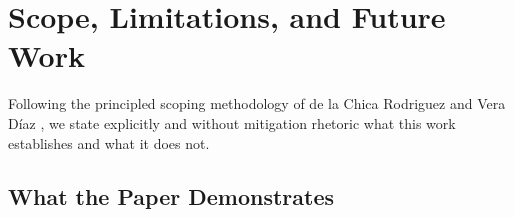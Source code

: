 \documentclass[11pt]{article}
\begin{document}
\section{Scope, Limitations, and Future Work}
\label{sec:boundaries}

Following the principled scoping methodology of de la Chica Rodriguez and Vera D\'{i}az \cite{delachica2026}, we state explicitly and without mitigation rhetoric what this work establishes and what it does not.

\subsection{What the Paper Demonstrates}
\end{document}
